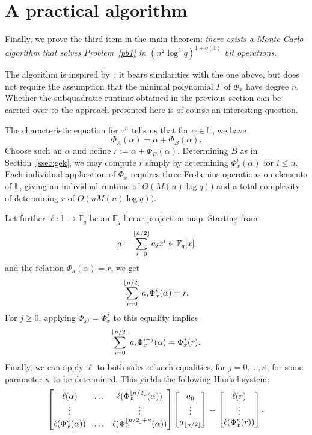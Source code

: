 \documentclass[sigconf]{acmart}
\newcommand{\F}{\mathbb{F}}
\renewcommand{\L}{\mathbb{L}}
\DeclarePairedDelimiter\floor{\lfloor}{\rfloor}
\begin{document}

\section{A practical algorithm}\label{sec:mc}

Finally, we prove the third item in the main theorem: {\em there
  exists a Monte Carlo algorithm that solves Problem~\ref{pb1} in
  $(n^2 \log^2 q)^{1+o(1)}$ bit operations.}

The algorithm is inspired by~\cite[Th.~5]{Shoup94}; it bears
similarities with the one above, but does not require the assumption
that the minimal polynomial $\Gamma$ of $\Phi_x$ have degree
$n$. Whether the subquadratic runtime obtained in the previous section
can be carried over to the approach presented here is of course an
interesting question.

The characteristic equation for $\tau^n$ tells us that for $\alpha \in
\L$, we have
\[\Phi_A(\alpha)=\alpha + \Phi_B(\alpha).\]
Choose such an $\alpha$ and define $r:=\alpha +
\Phi_B(\alpha)$. Determining $B$ as in Section~\ref{ssec:gek}, we may
compute $r$ simply by determining $\Phi_x^i(\alpha)$ for $i \leq
n$. Each individual application of $\Phi_x$ requires three Frobenius
operations on elements of $\L$, giving an individual runtime of
$O(M(n) \log q))$ and a total complexity of determining $r$ of
$O(nM(n) \log q))$.

Let further $\ell: \L \to \F_q$ be an $\F_q$-linear projection map.
Starting from 
\[a = \sum_{i = 0}^{\floor*{n/2}}a_ix^i \in \F_q[x]\]
and the relation $\Phi_a(\alpha)=r$,
we get
\[  \sum_{i = 0}^{\floor*{n/2}}a_i\Phi_x^i(\alpha)  = r.\]
For $j \geq 0$, applying $\Phi_{x^j}=\Phi_x^j$ to this equality implies
\[ \sum_{i = 0}^{\floor*{n/2}}a_i \Phi_x^{i+j}(\alpha) = \Phi_x^j(r).\]
Finally, we can apply $\ell$ to both sides of such equalities,
for $j=0,\dots,\kappa$, for some parameter $\kappa$ to be determined.
This yields the following Hankel system:
\begin{align}\label{eq:H}
\begin{bmatrix}
   \ell(\alpha) & \ldots & \ell(\Phi_x^{\floor*{n/2}}(\alpha)) \\
    \vdots & & \vdots  \\ 
  \ell(\Phi_x^{\kappa}(\alpha)) &  \ldots & \ell(\Phi_x^{\floor*{n/2} + \kappa}(\alpha))
\end{bmatrix} 
\begin{bmatrix} a_0  \\ \vdots \\ a_{\floor*{n/2}} \end{bmatrix} 
= 
\begin{bmatrix} \ell(r) \\ \vdots \\   \ell(\Phi_x^{\kappa}(r)) \end{bmatrix}. 
\end{align}
\end{document}
